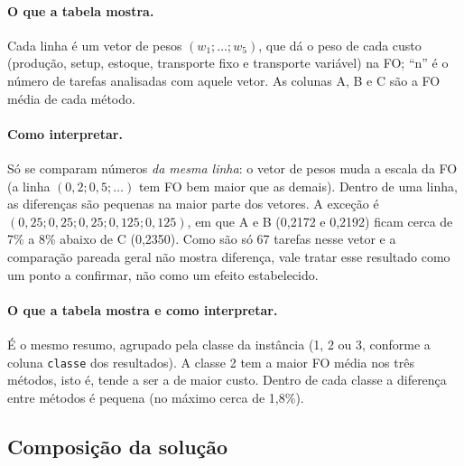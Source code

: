 \documentclass[11pt,a4paper]{article}
\begin{document}
\paragraph{O que a tabela mostra.} Cada linha é um vetor de pesos $(w_1;\ldots;w_5)$,
que dá o peso de cada custo (produção, setup, estoque, transporte fixo e
transporte variável) na FO; ``n'' é o número de tarefas analisadas com aquele vetor.
As colunas A, B e C são a FO média de cada método.

\paragraph{Como interpretar.} Só se comparam números \emph{da mesma linha}: o vetor de
pesos muda a escala da FO (a linha $(0{,}2;0{,}5;\ldots)$ tem FO bem maior que as
demais). Dentro de uma linha, as diferenças são pequenas na maior parte dos vetores. A
exceção é $(0{,}25;0{,}25;0{,}25;0{,}125;0{,}125)$, em que A e B (0,2172 e 0,2192) ficam
cerca de 7\% a 8\% abaixo de C (0,2350). Como são só 67 tarefas nesse vetor e a
comparação pareada geral não mostra diferença, vale tratar esse resultado como um ponto
a confirmar, não como um efeito estabelecido.

\begin{table}[H]
  \centering
  \small
  
  \caption{FO média por classe de instância e por método, nas tarefas analisadas.}
  \label{tab:fo-classe}
\end{table}

\paragraph{O que a tabela mostra e como interpretar.} É o mesmo resumo, agrupado pela
classe da instância (1, 2 ou 3, conforme a coluna \texttt{classe} dos resultados). A classe
2 tem a maior FO média nos três métodos, isto é, tende a ser a de maior custo. Dentro de
cada classe a diferença entre métodos é pequena (no máximo cerca de 1,8\%).

\subsection{Composição da solução}

\begin{table}[H]
  \centering
  \small
  
  \caption{Média dos totais de cada componente de custo nas tarefas analisadas.}
  \label{tab:componentes}
\end{table}
\end{document}
